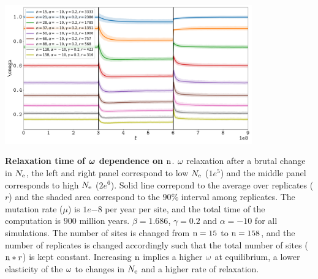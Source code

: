\documentclass{article}
\begin{document}
\begin{center}
	\includegraphics[width=0.8\textwidth] {artworks/Relaxation-Stability.pdf}
\end{center}
\textbf{Relaxation time of $\bm{\omega}$ dependence on $\text{n}$}.
$\omega$ relaxation after a brutal change in $N_{\mathrm{e}}$, the left and right panel correspond to low $N_{\mathrm{e}}$ ($1e^{5}$) and the middle panel corresponds to high $N_{\mathrm{e}}$ ($2e^{6}$). 
Solid line correpond to the average over replicates ($r$) and the shaded area correspond to the $90\%$ interval among replicates. 
The mutation rate ($\mu$) is $1e{-8}$ per year per site, and the total time of the computation is $900$ million years.
$\beta=1.686$, $\gamma=0.2$ and $\alpha=-10$ for all simulations. The number of sites is changed from $\text{n}=15$ to $\text{n}=158$, and the number of replicates is changed accordingly such that the total number of sites ($\text{n}*r$) is kept constant.
Increasing $\text{n}$ implies a higher $\omega$ at equilibrium, a lower elasticity of the $\omega$ to changes in $N_{\mathrm{e}}$ and a higher rate of relaxation.
\end{document}
